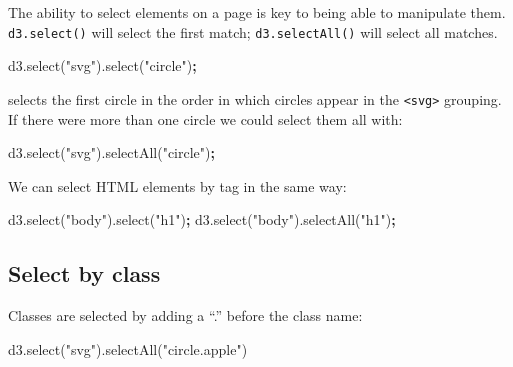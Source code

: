 \documentclass[openany]{book}
\newenvironment{Shaded}{\begin{snugshade}}{\end{snugshade}}
\newcommand{\AttributeTok}[1]{\textcolor[rgb]{0.77,0.63,0.00}{#1}}
\newcommand{\NormalTok}[1]{#1}
\newcommand{\OperatorTok}[1]{\textcolor[rgb]{0.81,0.36,0.00}{\textbf{#1}}}
\newcommand{\StringTok}[1]{\textcolor[rgb]{0.31,0.60,0.02}{#1}}
\newcommand{\VariableTok}[1]{\textcolor[rgb]{0.00,0.00,0.00}{#1}}
\begin{document}
The ability to select elements on a page is key to being able to manipulate them. \texttt{d3.select()} will select the first match; \texttt{d3.selectAll()} will select all matches.

\begin{Shaded}
\begin{Highlighting}[]
\VariableTok{d3}\NormalTok{.}\AttributeTok{select}\NormalTok{(}\StringTok{"svg"}\NormalTok{).}\AttributeTok{select}\NormalTok{(}\StringTok{"circle"}\NormalTok{)}\OperatorTok{;}
\end{Highlighting}
\end{Shaded}

selects the first circle in the order in which circles appear in the \texttt{\textless{}svg\textgreater{}} grouping. If there were more than one circle we could select them all with:

\begin{Shaded}
\begin{Highlighting}[]
\VariableTok{d3}\NormalTok{.}\AttributeTok{select}\NormalTok{(}\StringTok{"svg"}\NormalTok{).}\AttributeTok{selectAll}\NormalTok{(}\StringTok{"circle"}\NormalTok{)}\OperatorTok{;}
\end{Highlighting}
\end{Shaded}

We can select HTML elements by tag in the same way:

\begin{Shaded}
\begin{Highlighting}[]
\VariableTok{d3}\NormalTok{.}\AttributeTok{select}\NormalTok{(}\StringTok{"body"}\NormalTok{).}\AttributeTok{select}\NormalTok{(}\StringTok{"h1"}\NormalTok{)}\OperatorTok{;}
\VariableTok{d3}\NormalTok{.}\AttributeTok{select}\NormalTok{(}\StringTok{"body"}\NormalTok{).}\AttributeTok{selectAll}\NormalTok{(}\StringTok{"h1"}\NormalTok{)}\OperatorTok{;}
\end{Highlighting}
\end{Shaded}

\hypertarget{select-by-class}{%
\subsection{Select by class}\label{select-by-class}}

Classes are selected by adding a ``.'' before the class name:

\begin{Shaded}
\begin{Highlighting}[]
\VariableTok{d3}\NormalTok{.}\AttributeTok{select}\NormalTok{(}\StringTok{"svg"}\NormalTok{).}\AttributeTok{selectAll}\NormalTok{(}\StringTok{"circle.apple"}\NormalTok{)}
\end{Highlighting}
\end{Shaded}
\end{document}
